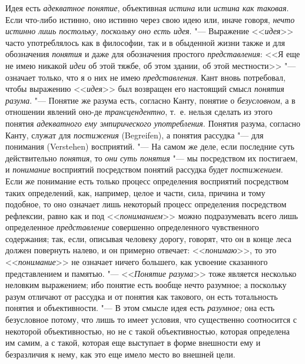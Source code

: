 Идея есть {\em адекватное понятие}, объективная
{\em истина} или
{\em истина как таковая}.
Если что-либо истинно, оно истинно через свою идею или, иначе
говоря, {\em нечто истинно лишь
постольку, поскольку оно есть идея}. "--- Выражение
<<{\em идея}>> часто
употреблялось как в философии, так и в обыденной жизни также и для
обозначения {\em понятия}
и даже для обозначения простого
{\em представления}: <<Я
еще не имею никакой {\em идеи}
об этой тяжбе, об этом здании, об этой местности>>
"--- означает только, что я о них не имею
{\em представления}. Кант
вновь потребовал, чтобы выражению
<<{\em идея}>> был
возвращен его настоящий смысл
{\em понятия разума}.
"--- Понятие же разума есть, согласно Канту, понятие о
{\em безусловном}, а в
отношении явлений оно-де
{\em трансцендентно},
т.~е. нельзя сделать из этого понятия
{\em адекватного ему эмпирического
употребления}. Понятия разума, согласно Канту, служат для
{\em постижения} (Begreifen),
а понятия рассудка "--- для понимания (Verstehen)
восприятий. "--- На самом же деле, если последние суть
действительно {\em понятия}, то {\em они}
{\em суть понятия} "--- мы посредством их постигаем, и {\em понимание}
восприятий посредством понятий рассудка будет {\em постижением}. Если
же понимание есть только процесс определения восприятий посредством таких
определений, как, например, целое и части, сила, причина и тому подобное,
то оно означает лишь некоторый процесс определения посредством рефлексии,
равно как и под <<{\em пониманием}>>
можно подразумевать всего лишь определенное {\em представление}
совершенно определенного чувственного содержания; так, если,
описывая человеку дорогу, говорят, что он в конце леса должен повернуть
налево, и он примерно отвечает: <<{\em понимаю}>>, то это
<<{\em понимание}>> не означает ничего большего, как усвоение сказанного
представлением и памятью. "--- <<{\em Понятие разума}>>
тоже является несколько неловким выражением; ибо понятие есть
вообще нечто разумное; а поскольку разум отличают от рассудка и от понятия
как такового, он есть тотальность понятия и объективности. "---
В этом смысле идея есть {\em разумное;} она есть
безусловное потому, что лишь то имеет условия, что существенно соотносится
с некоторой объективностью, но не с такой объективностью, которая
определена им самим, а с такой, которая еще выступает в форме внешности ему
и безразличия к нему, как это еще имело место во внешней цели.

